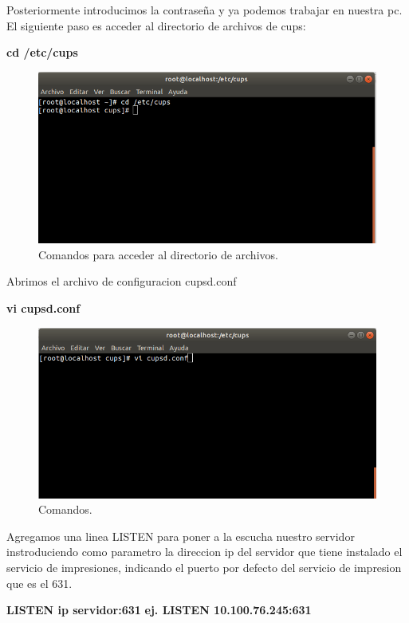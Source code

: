 Posteriormente introducimos la contraseña y ya podemos trabajar en nuestra pc.
El siguiente paso es acceder al directorio de archivos de cups:
\\
\begin{center}
						\textbf{cd /etc/cups}
\end {center}
\FloatBarrier
\begin{figure}[htbp!]
		\centering
			\includegraphics[width=.9\textwidth]{images/r3}
		\caption{Comandos para acceder al directorio de archivos.}
		\label{image:r3}
\end{figure}
\FloatBarrier
Abrimos el archivo de configuracion cupsd.conf
\\
\begin{center}
\textbf{vi cupsd.conf}
\end {center}
\FloatBarrier
\begin{figure}[htbp!]
		\centering
			\includegraphics[width=.9\textwidth]{images/r4}
		\caption{Comandos.}
		\label{image:r4}
\end{figure}
\FloatBarrier
Agregamos una linea LISTEN para poner a la escucha nuestro servidor instroduciendo como parametro la direccion ip del servidor que tiene instalado el servicio de impresiones, indicando el puerto por defecto del servicio de impresion que es el 631.
\\
\begin{center}
					\textbf{LISTEN ip servidor:631}
					\textbf{ej. LISTEN 10.100.76.245:631}
\end {center}
